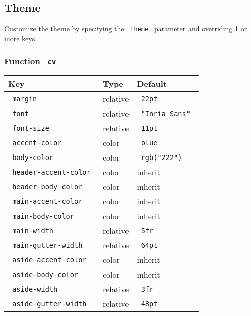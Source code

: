 \begin{Shaded}
\begin{Highlighting}[]
\end{Highlighting}
\end{Shaded}

\subsection{Theme}\label{theme}

Customize the theme by specifying the \texttt{\ theme\ } parameter and
overriding 1 or more keys.

\subsubsection{\texorpdfstring{Function
\texttt{\ cv\ }}{Function  cv }}\label{function-cv}

\begin{longtable}[]{@{}lll@{}}
\toprule\noalign{}
Key & Type & Default \\
\midrule\noalign{}
\endhead
\bottomrule\noalign{}
\endlastfoot
\texttt{\ margin\ } & relative & \texttt{\ 22pt\ } \\
\texttt{\ font\ } & relative & \texttt{\ "Inria\ Sans"\ } \\
\texttt{\ font-size\ } & relative & \texttt{\ 11pt\ } \\
\texttt{\ accent-color\ } & color & \texttt{\ blue\ } \\
\texttt{\ body-color\ } & color & \texttt{\ rgb("222")\ } \\
\texttt{\ header-accent-color\ } & color & inherit \\
\texttt{\ header-body-color\ } & color & inherit \\
\texttt{\ main-accent-color\ } & color & inherit \\
\texttt{\ main-body-color\ } & color & inherit \\
\texttt{\ main-width\ } & relative & \texttt{\ 5fr\ } \\
\texttt{\ main-gutter-width\ } & relative & \texttt{\ 64pt\ } \\
\texttt{\ aside-accent-color\ } & color & inherit \\
\texttt{\ aside-body-color\ } & color & inherit \\
\texttt{\ aside-width\ } & relative & \texttt{\ 3fr\ } \\
\texttt{\ aside-gutter-width\ } & relative & \texttt{\ 48pt\ } \\
\end{longtable}

